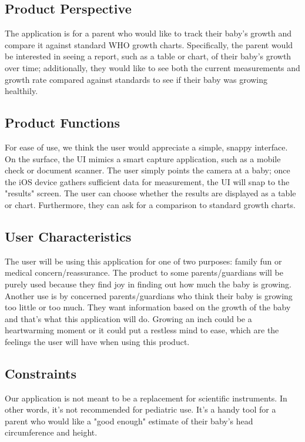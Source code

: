 \documentclass[letterpaper,10pt,draftclsnofoot,onecolumn,compsoc]{IEEEtran}
\begin{document}
\subsection{Product Perspective}
\begin{singlespace}
\noindent
    The application is for a parent who would like to track their baby's growth and compare it against standard WHO growth charts. Specifically, the parent would be interested in seeing a report, such as a  table or chart, of their baby's growth over time; additionally, they would like to see both the current measurements and growth rate compared against standards to see if their baby was growing healthily.
\end{singlespace}

\subsection{Product Functions}
\begin{singlespace}
\noindent
For ease of use, we think the user would appreciate a simple, snappy interface. On the surface, the UI mimics a smart capture application, such as a mobile check or document scanner. The user simply points the camera at a baby; once the iOS device gathers sufficient data for measurement, the UI will snap to the "results" screen. The user can choose whether the results are displayed as a table or chart. Furthermore, they can ask for a comparison to standard growth charts.
\end{singlespace}

\subsection{User Characteristics}
\begin{singlespace}
\noindent
The user will be using this application for one of two purposes: family fun or medical concern/reassurance. The product to some parents/guardians will be purely used because they find joy in finding out how much the baby is growing. Another use is by concerned parents/guardians who think their baby is growing too little or too much. They want information based on the growth of the baby and that's what this application will do. Growing an inch could be a heartwarming moment or it could put a restless mind to ease, which are the feelings the user will have when using this product.
\end{singlespace}

\subsection{Constraints}
\begin{singlespace}
\noindent
Our application is not meant to be a replacement for scientific instruments. In other words, it's not recommended for pediatric use. It's a handy tool for a parent who would like a "good enough" estimate of their baby's head circumference and height.
\end{singlespace}
\end{document}
